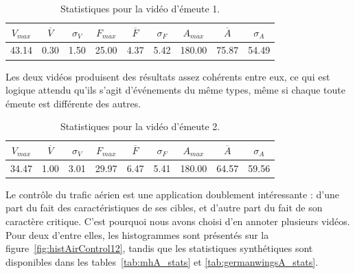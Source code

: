 \begin{table}
	\centering
	\begin{tabular}{c c c c c c c c c}
		$V_{max}$	& $\overline{V}$	& $\sigma_{V}$	& $F_{max}$	& $\overline{F}$	& $\sigma_{F}$	& $A_{max}$	& $\overline{A}$	& $\sigma_{A}$	\bigstrut[b] \\ \hline

		43.14		& 0.30				& 1.50			& 25.00		& 4.37				& 5.42			& 180.00	& 75.87				& 54.49			\bigstrut[t] \\
	\end{tabular}
	\caption[Statistiques pour la vidéo d'émeute 1]{Statistiques pour la vidéo d'émeute 1.}
	\label{tab:riot_stats}
\end{table}

	Les deux vidéos produisent des résultats assez cohérents entre eux, ce qui est logique attendu qu'ils s'agit d'événements du même types, même si chaque toute émeute est différente des autres.

\begin{table}
	\centering
	\begin{tabular}{c c c c c c c c c}
		$V_{max}$	& $\overline{V}$	& $\sigma_{V}$	& $F_{max}$	& $\overline{F}$	& $\sigma_{F}$	& $A_{max}$	& $\overline{A}$	& $\sigma_{A}$	\bigstrut[b] \\ \hline

		34.47		& 1.00				& 3.01			& 29.97		& 6.47				& 5.41			& 180.00	& 64.57				& 59.56			\bigstrut[t] \\
	\end{tabular}
	\caption[Statistiques pour la vidéo d'émeute 2]{Statistiques pour la vidéo d'émeute 2.}
	\label{tab:riot2a_stats}
\end{table}

	Le contrôle du trafic aérien est une application doublement intéressante : d'une part du fait des caractéristiques de ses cibles, et d'autre part du fait de son caractère critique. C'est pourquoi nous avons choisi d'en annoter plusieurs vidéos. Pour deux d'entre elles, les histogrammes sont présentés sur la figure~\ref{fig:histAirControl12}, tandis que les statistiques synthétiques sont disponibles dans les tables~\ref{tab:mhA_stats} et \ref{tab:germanwingsA_stats}.
	
